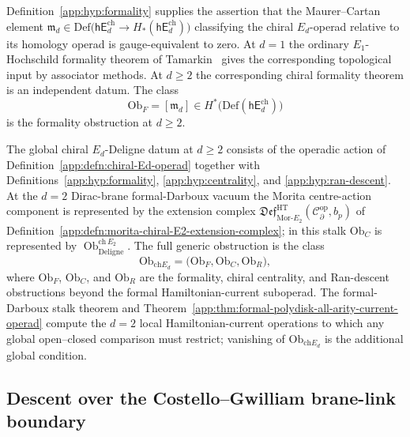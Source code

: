 \begin{rmk}\label{app:rmk:formality-obstruction}
Definition~\ref{app:hyp:formality} supplies the assertion that the
Maurer--Cartan element
$\mathfrak m_d\in\mathrm{Def}\bigl(\mathsf{hE}_d^{\mathrm{ch}}\to
H_*(\mathsf{hE}_d^{\mathrm{ch}})\bigr)$ classifying the chiral
\(E_d\)-operad relative to its homology operad is gauge-equivalent to
zero.  At \(d=1\) the ordinary \(E_1\)-Hochschild formality theorem of
Tamarkin~\cite{tamarkin-deligne} gives the corresponding topological
input by associator methods.  At \(d\geq2\)
the corresponding chiral formality theorem is an independent datum.  The class
\[
  \mathrm{Ob}_F=[\mathfrak m_d]
   \in H^*\bigl(\mathrm{Def}(\mathsf{hE}_d^{\mathrm{ch}})\bigr)
\]
is the formality obstruction at $d\geq 2$.
\end{rmk}

\begin{rmk}\label{app:rmk:chiral-Ed-obstruction}
The global chiral \(E_d\)-Deligne datum at \(d\geq2\) consists of the
operadic action of Definition~\ref{app:defn:chiral-Ed-operad} together
with Definitions~\ref{app:hyp:formality}, \ref{app:hyp:centrality}, and
\ref{app:hyp:ran-descent}.  At the \(d=2\) Dirac-brane
formal-Darboux vacuum the Morita centre-action component is represented
by the extension complex
\(\mathfrak{Def}^{\mathrm{HT}}_{\mathrm{Mor}\mbox{-}E_2}
(\mathcal C^{\mathrm{op}}_\partial,b_p)\) of
Definition~\ref{app:defn:morita-chiral-E2-extension-complex}; in this
stalk \(\mathrm{Ob}_C\) is represented by
\(\operatorname{Ob}^{\mathrm{ch}\,E_2}_{\mathrm{Deligne}}\).  The full
generic obstruction is the class
\[
  \mathrm{Ob}_{\mathrm{ch}E_d}
   =
	   \bigl(
	   \mathrm{Ob}_{F},
	   \mathrm{Ob}_{C},
	   \mathrm{Ob}_{R}
	   \bigr),
\]
where \(\mathrm{Ob}_{F}\), \(\mathrm{Ob}_{C}\), and \(\mathrm{Ob}_{R}\)
are the formality, chiral centrality, and Ran-descent obstructions
beyond the formal Hamiltonian-current suboperad.  The formal-Darboux
stalk theorem and Theorem~\ref{app:thm:formal-polydisk-all-arity-current-operad}
compute the \(d=2\) local Hamiltonian-current operations to which any
global open--closed comparison must restrict; vanishing of
\(\mathrm{Ob}_{\mathrm{ch}E_d}\) is the additional global condition.
\end{rmk}

\subsection{Descent over the Costello--Gwilliam brane-link boundary}\label{app:hfc:CG-descent}

